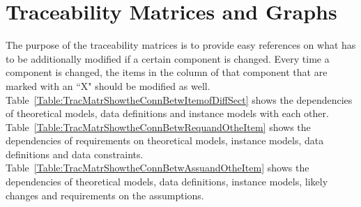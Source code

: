 \documentclass[12pt]{article}
\begin{document}
\section{Traceability Matrices and Graphs}
\label{Sec:TracMatrandGrap}
The purpose of the traceability matrices is to provide easy references on what has to be additionally modified if a certain component is changed. Every time a component is changed, the items in the column of that component that are marked with an ``X" should be modified as well. Table~\ref{Table:TracMatrShowtheConnBetwItemofDiffSect} shows the dependencies of theoretical models, data definitions and instance models with each other. Table~\ref{Table:TracMatrShowtheConnBetwRequandOtheItem} shows the dependencies of requirements on theoretical models, instance models, data definitions and data constraints. Table~\ref{Table:TracMatrShowtheConnBetwAssuandOtheItem} shows the dependencies of theoretical models, data definitions, instance models, likely changes and requirements on the assumptions.
\end{document}
